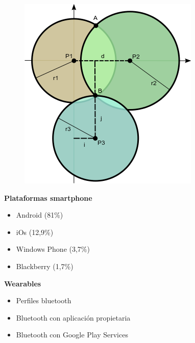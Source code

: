 \begin{slide}
  \begin{figure}[!h]
    \begin{center}
      \includegraphics[height=0.7\textheight]{img/trilateracion.png}
    \end{center}
  \end{figure}
\end{slide}

\begin{slide}
  \begin{block}{\textbf{Plataformas smartphone}}
    \begin{itemize}
      \item Android (81\%)
      \item iOs (12,9\%)
      \item Windows Phone (3,7\%)
      \item Blackberry (1,7\%)
    \end{itemize}
  \end{block}
\end{slide}

\begin{slide}
  \begin{block}{\textbf{Wearables}}
    \begin{itemize}
      \item Perfiles bluetooth
      \item Bluetooth con aplicación propietaria
      \item Bluetooth con Google Play Services
    \end{itemize}
  \end{block}
\end{slide}

